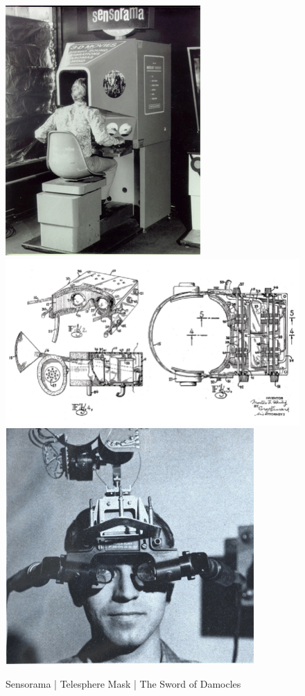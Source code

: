 \begin{figure}[h]
	\centering
	\includegraphics[width=0.22\linewidth]{Bilder/A14_Sensorama}
	\includegraphics[width=0.3\linewidth]{Bilder/A15_TelesphereMask}
	\includegraphics[width=0.3\linewidth]{Bilder/A16_SwordDamocles}
	\caption{Sensorama | Telesphere Mask | The Sword of Damocles \cite{A14,A15,A16}}
	\label{fig:SensoramaTelesphereSword}
\end{figure}

